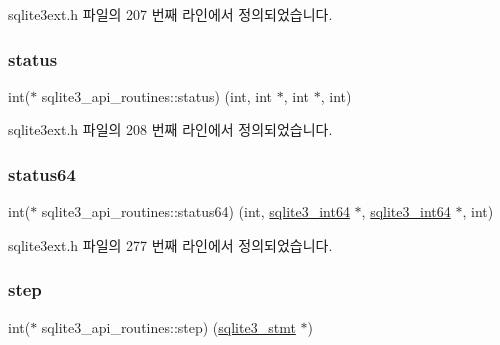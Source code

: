 sqlite3ext.\+h 파일의 207 번째 라인에서 정의되었습니다.

\mbox{\label{structsqlite3__api__routines_a8fe0dcf3d691ef190272907e6fc9a8ae}} 
\subsubsection{\texorpdfstring{status}{status}}
{\footnotesize\ttfamily int($\ast$ sqlite3\+\_\+api\+\_\+routines\+::status) (int, int $\ast$, int $\ast$, int)}



sqlite3ext.\+h 파일의 208 번째 라인에서 정의되었습니다.

\mbox{\label{structsqlite3__api__routines_a9c7fc0670fc12345b03148a9b7cd22e0}} 
\subsubsection{\texorpdfstring{status64}{status64}}
{\footnotesize\ttfamily int($\ast$ sqlite3\+\_\+api\+\_\+routines\+::status64) (int, \hyperlink{sqlite3_8h_a0a4d3e6c1ad46f90e746b920ab6ca0d2}{sqlite3\+\_\+int64} $\ast$, \hyperlink{sqlite3_8h_a0a4d3e6c1ad46f90e746b920ab6ca0d2}{sqlite3\+\_\+int64} $\ast$, int)}



sqlite3ext.\+h 파일의 277 번째 라인에서 정의되었습니다.

\mbox{\label{structsqlite3__api__routines_ad83c0c75185e68a850ec912cb886af0d}} 
\subsubsection{\texorpdfstring{step}{step}}
{\footnotesize\ttfamily int($\ast$ sqlite3\+\_\+api\+\_\+routines\+::step) (\hyperlink{sqlite3_8h_af2a033da1327cdd77f0a174a09aedd0c}{sqlite3\+\_\+stmt} $\ast$)}



